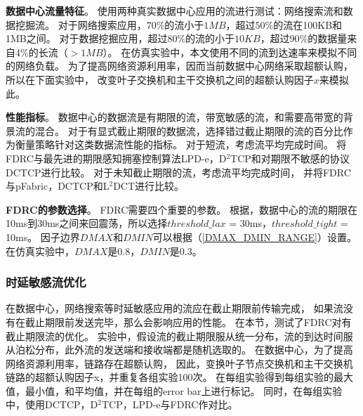 \textbf{数据中心流量特征}。
使用两种真实数据中心应用的流进行测试：网络搜索流和数据挖掘流\cite{DCTCP,LPD,pFabric}。
对于网络搜索应用，$70\%$的流小于$1MB$，超过$50\%$的流在100KB和1MB之间。
对于数据挖掘应用，超过80$\%$的流的小于$10KB$，超过90$\%$的数据量来自$4\%$的长流（$>1MB$）。
在仿真实验中，本文使用不同的流到达速率来模拟不同的网络负载。
为了提高网络资源利用率，因而当前数据中心网络采取超额认购，所以在下面实验中，
改变叶子交换机和主干交换机之间的超额认购因子$x$来模拟此。

\textbf{性能指标}。
数据中心的数据流是有期限的流，带宽敏感的流，和需要高带宽的背景流的混合。
对于有显式截止期限的数据流，选择错过截止期限的流的百分比作为衡量策略针对这类数据流性能的指标。
对于短流，考虑流平均完成时间。
将FDRC与最先进的期限感知拥塞控制算法LPD-e\cite{LPD}，D$^2$TCP\cite{D2TCP}和对期限不敏感的协议DCTCP\cite{DCTCP}进行比较。
对于未知截止期限的流，考虑流平均完成时间，
并将FDRC与pFabric\cite{pFabric}，DCTCP\cite{DCTCP}和L$^2$DCT\cite{L2DCT}进行比较。

\textbf{FDRC的参数选择}。 
FDRC需要四个重要的参数。
根据\cite{D3}，数据中心的流的期限在10ms到30ms之间来回震荡，所以选择$threshold\_lax$ = 30ms，$threshold\_tight$ = 10ms。
因子边界$DMAX$和$DMIN$可以根据（\ref{DMAX_DMIN_RANGE}）设置。
在仿真实验中，$DMAX$是0.8，$DMIN$是0.3。


\subsubsection{时延敏感流优化}
在数据中心，网络搜索等时延敏感应用的流应在截止期限前传输完成，
如果流没有在截止期限前发送完毕，那么会影响应用的性能。
在本节，测试了FDRC对有截止期限流的优化。
实验中，假设流的截止期限服从统一分布，流的到达时间服从泊松分布，此外流的发送端和接收端都是随机选取的。
在数据中心，为了提高网络资源利用率，链路存在超额认购，
因此，变换叶子节点交换机和主干交换机链路的超额认购因子x，并重复各组实验100次。
在每组实验得到每组实验的最大值，最小值，和平均值，并在每组的error bar上进行标记。
同时，在每组实验中，使用DCTCP，D$^2$TCP，LPD-e与FDRC作对比。

